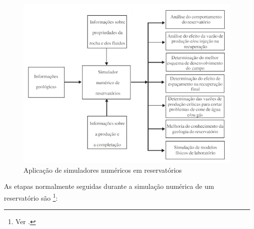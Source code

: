 \begin{figure}[!ht]
	\centering
	\includegraphics[width=.75\textwidth]{figs/revisao/revisao_simsec1}
	\caption{Aplica\c{c}\~{a}o de simuladores num\'{e}ricos em reservat\'{o}rios \cite[p. 522]{engres}}
	\label{fig:revisao_simsec1}
\end{figure}  

As etapas normalmente seguidas durante a simula\c{c}\~{a}o num\'{e}rica de um reservat\'{o}rio s\~{a}o \footnote{Ver \cite[pp. 523--524]{engres}.}:


